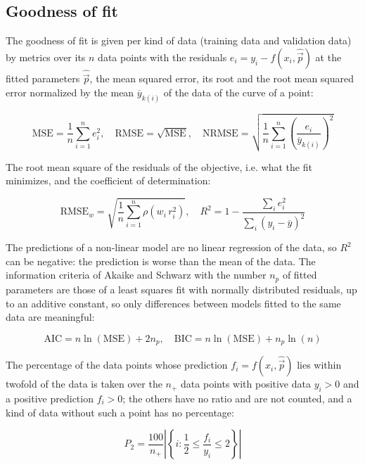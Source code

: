 \documentclass{article}
\begin{document}
\subsection{Goodness of fit}

The goodness of fit is given per kind of data (training data and validation data) by metrics over its $n$ data points with the residuals $e_i = y_i - f(x_i, \hat{\vec{p}})$ at the fitted parameters $\hat{\vec{p}}$, the mean squared error, its root and the root mean squared error normalized by the mean $\overline{y}_{k(i)}$ of the data of the curve of a point:

\begin{equation}
\mathrm{MSE} = \frac{1}{n} \sum_{i=1}^{n} e_i^2, \quad \mathrm{RMSE} = \sqrt{\mathrm{MSE}}, \quad \mathrm{NRMSE} = \sqrt{\frac{1}{n} \sum_{i=1}^{n} \left(\frac{e_i}{\overline{y}_{k(i)}}\right)^2}
\end{equation}

The root mean square of the residuals of the objective, i.e. what the fit minimizes, and the coefficient of determination:

\begin{equation}
\mathrm{RMSE}_w = \sqrt{\frac{1}{n} \sum_{i=1}^{n} \rho\left(w_i\, r_i^2\right)}, \quad R^2 = 1 - \frac{\sum_{i} e_i^2}{\sum_{i} \left(y_i - \overline{y}\right)^2}
\end{equation}

The predictions of a non-linear model are no linear regression of the data, so $R^2$ can be negative: the prediction is worse than the mean of the data. The information criteria of Akaike \cite{Akaike1974} and Schwarz \cite{Schwarz1978} with the number $n_p$ of fitted parameters are those of a least squares fit with normally distributed residuals, up to an additive constant, so only differences between models fitted to the same data are meaningful:

\begin{equation}
\mathrm{AIC} = n \ln(\mathrm{MSE}) + 2 n_p, \quad \mathrm{BIC} = n \ln(\mathrm{MSE}) + n_p \ln(n)
\end{equation}

The percentage of the data points whose prediction $f_i = f(x_i, \hat{\vec{p}})$ lies within twofold of the data is taken over the $n_+$ data points with positive data $y_i > 0$ and a positive prediction $f_i > 0$; the others have no ratio and are not counted, and a kind of data without such a point has no percentage:

\begin{equation}
P_2 = \frac{100}{n_+} \left|\left\{ i : \frac{1}{2} \le \frac{f_i}{y_i} \le 2 \right\}\right|
\end{equation}
\end{document}
